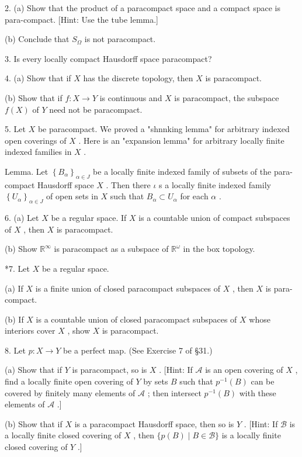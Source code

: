 2. (a) Show that the product of a paracompact space and a compact space is para-compact. [Hint: Use the tube lemma.]

(b) Conclude that \({S}_{\Omega }\) is not paracompact.

3. Is every locally compact Hausdorff space paracompact?

4. (a) Show that if \(X\) has the discrete topology, then \(X\) is paracompact.

(b) Show that if \(f : X \rightarrow  Y\) is continuous and \(X\) is paracompact, the subspace \(f\left( X\right)\) of \(Y\) need not be paracompact.

5. Let \(X\) be paracompact. We proved a "shnnking lemma" for arbitrary indexed open coverings of \(X\) . Here is an "expansion lemma" for arbitrary locally finite indexed families in \(X\) .

Lemma. Let \({\left\{  {B}_{\alpha }\right\}  }_{\alpha  \in  J}\) be a locally finite indexed family of subsets of the para-compact Hausdorff space \(X\) . Then there \(\iota\) s a locally finite indexed family \({\left\{  {U}_{\alpha }\right\}  }_{\alpha  \in  J}\) of open sets in \(X\) such that \({B}_{\alpha } \subset  {U}_{\alpha }\) for each \(\alpha\) .

6. (a) Let \(X\) be a regular space. If \(X\) is a countable union of compact subspaces of \(X\) , then \(X\) is paracompact.

(b) Show \({\mathbb{R}}^{\infty }\) is paracompact as a subspace of \({\mathbb{R}}^{\omega }\) in the box topology.

*7. Let \(X\) be a regular space.

(a) If \(X\) is a finite union of closed paracompact subspaces of \(X\) , then \(X\) is para-compact.

(b) If \(X\) is a countable union of closed paracompact subspaces of \(X\) whose interiors cover \(X\) , show \(X\) is paracompact.

8. Let \(p : X \rightarrow  Y\) be a perfect map. (See Exercise 7 of §31.)

(a) Show that if \(Y\) is paracompact, so is \(X\) . [Hint: If \(\mathcal{A}\) is an open covering of \(X\) , find a locally finite open covering of \(Y\) by sets \(B\) such that \({p}^{-1}\left( B\right)\) can be covered by finitely many elements of \(\mathcal{A}\) ; then intersect \({p}^{-1}\left( B\right)\) with these elements of \(\mathcal{A}\) .]

(b) Show that if \(X\) is a paracompact Hausdorff space, then so is \(Y\) . [Hint: If \(\mathcal{B}\) is a locally finite closed covering of \(X\) , then \(\{ p\left( B\right)  \mid  B \in  \mathcal{B}\}\) is a locally finite closed covering of \(Y\) .]

